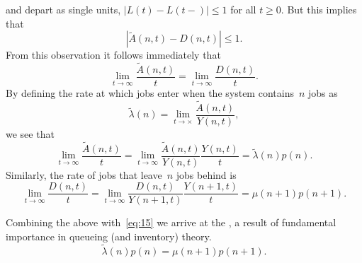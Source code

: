 \documentclass[queueing-book.tex]{subfiles}
\begin{document}
 and depart as single units, $|L(t) - L(t-)| \leq 1$ for all $t\geq 0$.
But this implies that
\begin{equation}\label{eq:97}
|\tilde A(n,t) - D(n,t)| \leq 1.
\end{equation}
From this observation it follows immediately that
\begin{equation}\label{eq:15}
 \lim_{t\to\infty} \frac{\tilde A(n,t)}t = \lim_{t\to\infty} \frac{D(n,t)}t.
\end{equation}
By defining the rate at which jobs enter when the system contains~$n$ jobs as
\begin{equation*}
\tilde \lambda(n) = \lim_{t\to\times} \frac{\tilde A(n,t)}{Y(n,t)},
\end{equation*}
we see that
\begin{equation*}
\lim_{t\to\infty} \frac{\tilde A(n,t)}t = \lim_{t\to\infty} \frac{\tilde A(n,t)}{Y(n,t)}\frac{Y(n,t)}t = \tilde \lambda(n) p(n).
\end{equation*}
Similarly, the rate of jobs that leave~$n$ jobs behind is
\begin{equation*}
\lim_{t\to\infty} \frac{D(n,t)}t = \lim_{t\to\infty} \frac{D(n,t)}{Y(n+1,t)}\frac{Y(n+1,t)}t = \mu(n+1) p(n+1).
\end{equation*}

Combining the above with~\cref{eq:15} we arrive at the , a result of fundamental importance in queueing (and inventory) theory.
\begin{equation}\label{eq:12}
\tilde \lambda(n) p(n) = \mu(n+1)p(n+1).
\end{equation}

\begin{marginfigure}%
\end{marginfigure}
\end{document}
